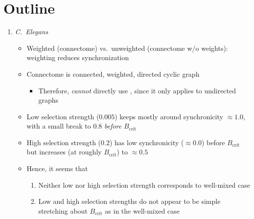 \documentclass{article}
\begin{document}
\section{Outline}
\begin{enumerate}
  \item \emph{C.\ Elegans}
  \begin{itemize}
    \item Weighted (connectome) vs.\ unweighted (connectome w/o
      weights): weighting reduces synchronization
    \item Connectome is connected, weighted, directed cyclic graph
    \begin{itemize}
      \item Therefore, \emph{cannot} directly use
        \textcite{allen2017evolutionary}, since it only applies to undirected
        graphs
    \end{itemize}
    \item Low selection strength ($0.005$) keeps mostly around synchronicity
      $\approx 1.0$, with a small break to 0.8 \emph{before} $B_{\text{crit}}$
    \item High selection strength ($0.2$) has low synchronicity
      ($\approx 0.0$) before $B_{\text{crit}}$ but increases (at roughly
      $B_{\text{crit}}$) to $\approx 0.5$
    \item Hence, it seems that
    \begin{enumerate}
      \item Neither low nor high selection strength corresponds to
        well-mixed case
      \item Low and high selection strengths do not appear to be simple
        stretching about $B_{\text{crit}}$ as in the well-mixed case
    \end{enumerate}
  \end{itemize}
\end{enumerate}

\printbibliography
\end{document}
